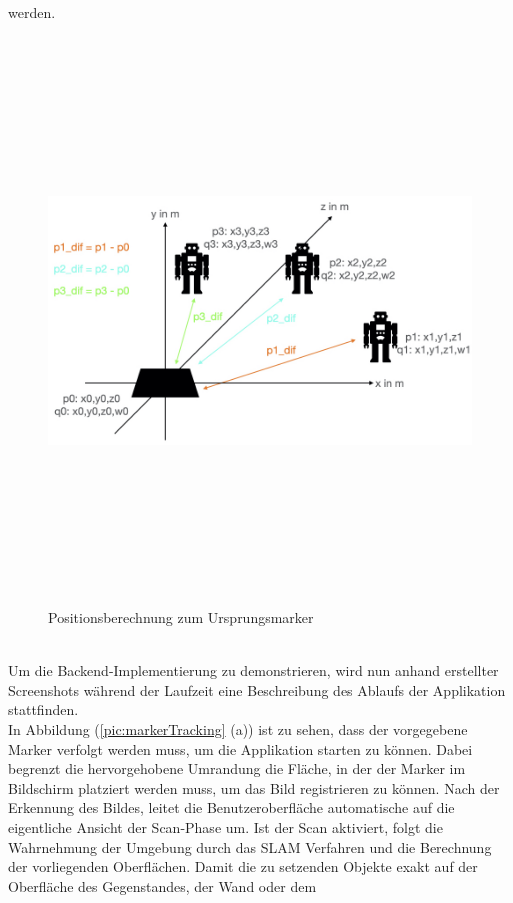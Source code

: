 werden.
\begin{figure}[hbt!]
    \centering
    \includegraphics[width=15cm,height=15cm,keepaspectratio]{4Umsetzung/Bilder/difcalc.jpeg}
    \caption{Positionsberechnung zum Ursprungsmarker}
    \label{pic:differenztoinitial}
\end{figure}
\pagebreak
\\ 
\linebreak
Um die Backend-Implementierung zu demonstrieren, wird nun anhand erstellter Screenshots während der Laufzeit eine Beschreibung des Ablaufs der Applikation stattfinden.
\\ 
In Abbildung (\ref{pic:markerTracking} (a)) ist zu sehen, dass der vorgegebene Marker verfolgt werden muss, um die Applikation starten zu können. Dabei begrenzt 
die hervorgehobene Umrandung die Fläche, in der der Marker im Bildschirm platziert werden muss, um das Bild registrieren zu können. Nach der Erkennung des Bildes, 
leitet die Benutzeroberfläche automatische auf die eigentliche Ansicht der Scan-Phase um. Ist der Scan aktiviert, folgt die Wahrnehmung der Umgebung durch das 
\acs{SLAM} Verfahren und die Berechnung der vorliegenden Oberflächen. Damit die zu setzenden Objekte exakt auf der Oberfläche des Gegenstandes, der Wand oder dem 
